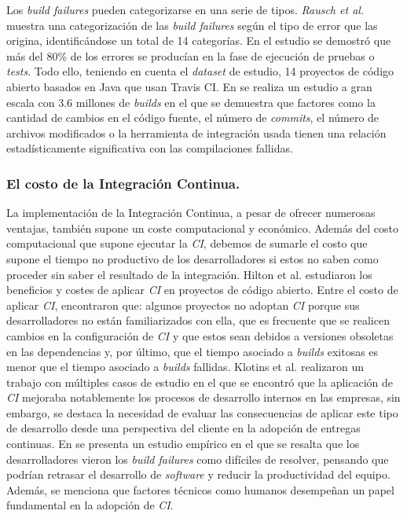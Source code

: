 Los \textit{build failures} pueden categorizarse en una serie de tipos. \textit{Rausch et al.}
\cite{13} muestra una categorización de las \textit{build failures} según el tipo de error
que las origina, identificándose un total de 14 categorías. En el estudio se demostró que más
del 80\% de los errores se producían en la fase de ejecución de pruebas o \textit{tests}. Todo
ello, teniendo en cuenta el \textit{dataset} de estudio, 14 proyectos de código abierto basados
en Java que usan Travis CI. En \cite{16} se realiza un estudio a gran escala con 3.6 millones
de \textit{builds} en el que se demuestra que factores como la cantidad de cambios en el código
fuente, el número de \textit{commits}, el número de archivos modificados o la herramienta de
integración usada tienen una relación estadísticamente significativa con las compilaciones
fallidas.\\ 

\subsubsection{El costo de la Integración Continua.}
La implementación de la Integración Continua, a pesar de ofrecer numerosas ventajas, también
supone un coste computacional y económico. Además del costo computacional que supone ejecutar
la \textit{CI}, debemos de sumarle el costo que supone el tiempo no productivo de los
desarrolladores si estos no saben como proceder sin saber el resultado de la integración.
Hilton et al. \cite{2} estudiaron los beneficios y costes de aplicar \textit{CI} en proyectos
de código abierto. Entre el costo de aplicar \textit{CI}, encontraron que: algunos proyectos
no adoptan \textit{CI} porque sus desarrolladores no están familiarizados con ella, que es
frecuente que se realicen cambios en la configuración de \textit{CI} y que estos sean debidos
a versiones obsoletas en las dependencias y, por último, que el tiempo asociado a
\textit{builds} exitosas es menor que el tiempo asociado a \textit{builds} fallidas. Klotins et
al. \cite{18} realizaron un trabajo con múltiples casos de estudio en el que se encontró que
la aplicación de \textit{CI} mejoraba notablemente los procesos de desarrollo internos en las
empresas, sin embargo, se destaca la necesidad de evaluar las consecuencias de aplicar este
tipo de desarrollo desde una perspectiva del cliente en la adopción de entregas continuas. En
\cite{17} se presenta un estudio empírico en el que se resalta que los desarrolladores vieron
los \textit{build failures} como difíciles de resolver, pensando que podrían retrasar el
desarrollo de \textit{software} y reducir la productividad del equipo. Además, se menciona
que factores técnicos como humanos desempeñan un papel fundamental en la adopción de
\textit{CI}.\\

